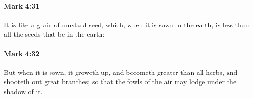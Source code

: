 		\paragraph{Mark 4:31} %
			\label{MARK-4-31}

			It is like a grain of mustard seed, which, when it is sown in the earth, is less than all the seeds that be in the earth:

			\begin{framed}
			\scriptsize
				\begin{compactdesc}
					\item[SBLG] 
				\end{compactdesc}
			\end{framed}

		\paragraph{Mark 4:32} %
			\label{MARK-4-32}

			But when it is sown, it groweth up, and becometh greater than all herbs, and shooteth out great branches; so that the fowls of the air may lodge under the shadow of it.

